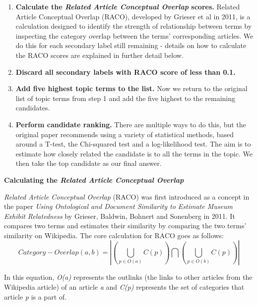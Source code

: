 \documentclass[12pt]{article}
\begin{document}
\begin{enumerate}
	\item \textbf{Calculate the \emph{Related Article Conceptual Overlap} scores.} Related Article Conceptual Overlap (RACO), developed by Grieser et al in 2011\cite{racoCalculation},  is a calculation designed to identify the strength of relationship between terms by inspecting the category overlap between the terms' corresponding articles. We do this for each secondary label still remaining - details on how to calculate the RACO scores are explained in further detail below. \\
	\item \textbf{Discard all secondary labels with RACO  score of less than 0.1.} \\
	\item \textbf{Add five highest topic terms to the list.} Now we return to the original list of topic terms from step 1 and add the five highest to the remaining candidates. \\
	\item \textbf{Perform candidate ranking.} There are multiple ways to do this, but the original paper recommends using a variety of statistical methods, based around a T-test, the Chi-squared test and a log-likelihood test. The aim is to estimate how closely related the candidate is to all the terms in the topic. We then take the top candidate as our final answer. \\
\end{enumerate}

\textbf{Calculating the \emph{Related Article Conceptual Overlap} }

\label{RACOcalculation}

\emph{Related Article Conceptual Overlap } (RACO) was first introduced as a concept in the paper \emph{Using Ontological and Document Similarity to Estimate Museum Exhibit Relatedness}\cite{racoCalculation} by Grieser, Baldwin, Bohnert and Sonenberg in 2011. It compares two terms and estimates their similarity by comparing the two terms' similarity on Wikipedia. The core calculation for RACO goes as follows: 
\[Category-Overlap(a,b) = \left|
\left(\bigcup_{p \in O(a)} C(p)\right) \bigcap \left(\bigcup_{p \in O(b)} C(p)\right)\right|
\]

In this equation, \emph{O(a)} represents the outlinks (the links to other articles from the Wikipedia article) of an article \emph{a} and \emph{C(p)} represents the set of categories that article \emph{p} is a part of.
\end{document}
